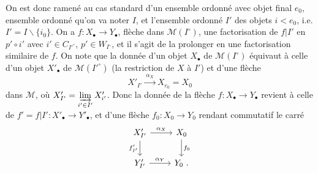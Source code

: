 \documentclass[11pt]{article}
\newcommand{\printedpage}[1]{\marginpar{\footnotesize p.~#1}}
\newcommand{\msp}[1]{\marginpar{\footnotesize [#1]}}
\begin{document}
On est donc ramené au cas standard d'un ensemble ordonné avec objet final $e_0$, ensemble ordonné qu'on va noter $I$, et l'ensemble ordonné $I'$ des objets $i<e_0$, i.e. $I'=I\backslash\{i_0\}$. %
On a $f:X_\bullet\longrightarrow Y_\bullet$, flèche dans $\mathcal{M}(I^\circ)$, une factorisation de $f|I'$ en $p'\circ i'$ avec $i'\in C_{I'^\circ}$, $p'\in W_{I^\circ}$, %
\msp{47}
et il s'agit de la prolonger en une factorisation similaire de $f$. On note que la donnée d'un objet $X_\bullet$ de $\mathcal{M}(I^\circ)$ équivaut à celle d'un objet $X'_\bullet$ de $\mathcal{M}(I'^\circ)$ (la restriction de $X$ à $I'$) et d'une flèche
\[
X'_{I'} \xrightarrow{\ \alpha_X\ } X_{e_0}=X_0
\]
dans $\mathcal{M}$, où $X'_{I'}=\varinjlim\limits_{i'\in I'}X'_{i'}$. Donc la donnée de la flèche $f:X_\bullet\longrightarrow Y_\bullet$ revient à celle de $f'=f|I':X'_\bullet\longrightarrow Y'_\bullet$, et d'une flèche $f_0:X_0\longrightarrow Y_0$ rendant commutatif le carré
\printedpage{25}
\[
\begin{tikzcd}
X'_{I'} \arrow[r, "\alpha_X"] \arrow[d, "f'_{I'}"'] & X_0 \arrow[d, "f_0"] \\
Y'_{I'} \arrow[r, "\alpha_Y"] & Y_0\ .
\end{tikzcd}
\]
\end{document}

